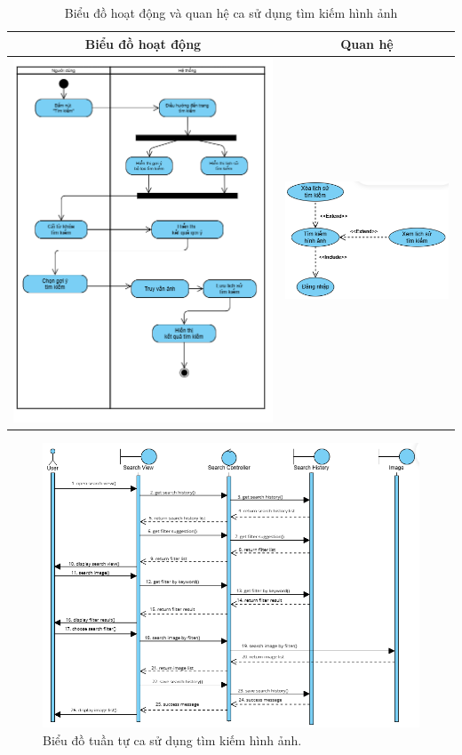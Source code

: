 \noindent 
\begin{table}[H]
\centering
\caption{Biểu đồ hoạt động và quan hệ ca sử dụng tìm kiếm hình ảnh}
\label{tab:search-image-usecase-activity}
\begin{tabular}{| c | c |}
    \hline
    \textbf{Biểu đồ hoạt động} & \textbf{Quan hệ} \\ 
    \hline
    \includegraphics[width=0.6\linewidth]{figures/c3/3-3-16-activity-diagram.png} 
    &  
    \includegraphics[width=0.35\linewidth]{figures/c3/3-3-16-relationship.png} \\ 
    \hline
\end{tabular}
\end{table}

\begin{figure}[H]
    \centering  
    \includegraphics[width=1\textwidth]{figures/c3/3-3-16-sequence-diagram.png}
    \caption{Biểu đồ tuần tự ca sử dụng tìm kiếm hình ảnh.}
    \label{fig:3-3-16-sequence-diagram}
\end{figure}